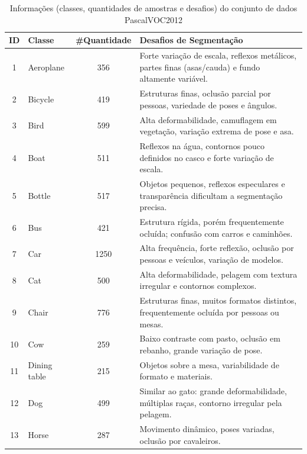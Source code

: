 \begin{table}[h!]
\centering
\caption{Informações (classes, quantidades de amostras e desafios) do conjunto de dados \ac{PascalVOC2012}}
\label{tab:pascal_classes}
\begin{tabular}{|c|l|c|p{9cm}|}
\hline
\textbf{ID} & \textbf{Classe} & \textbf{\#Quantidade} & \textbf{Desafios de Segmentação} \\
\hline

1  & Aeroplane     & 356 & Forte variação de escala, reflexos metálicos, partes finas (asas/cauda) e fundo altamente variável. \\ \hline
2  & Bicycle       & 419 & Estruturas finas, oclusão parcial por pessoas, variedade de poses e ângulos. \\ \hline
3  & Bird          & 599 & Alta deformabilidade, camuflagem em vegetação, variação extrema de pose e asa. \\ \hline
4  & Boat          & 511 & Reflexos na água, contornos pouco definidos no casco e forte variação de escala. \\ \hline
5  & Bottle        & 517 & Objetos pequenos, reflexos especulares e transparência dificultam a segmentação precisa. \\ \hline
6  & Bus           & 421 & Estrutura rígida, porém frequentemente ocluída; confusão com carros e caminhões. \\ \hline
7  & Car           & 1250 & Alta frequência, forte reflexão, oclusão por pessoas e veículos, variação de modelos. \\ \hline
8  & Cat           & 500 & Alta deformabilidade, pelagem com textura irregular e contornos complexos. \\ \hline
9  & Chair         & 776 & Estruturas finas, muitos formatos distintos, frequentemente ocluída por pessoas ou mesas. \\ \hline
10 & Cow           & 259 & Baixo contraste com pasto, oclusão em rebanho, grande variação de pose. \\ \hline
11 & Dining table   & 215 & Objetos sobre a mesa, variabilidade de formato e materiais. \\ \hline
12 & Dog           & 499 & Similar ao gato: grande deformabilidade, múltiplas raças, contorno irregular pela pelagem. \\ \hline
13 & Horse         & 287 & Movimento dinâmico, poses variadas, oclusão por cavaleiros. \\ \hline

\end{tabular}
\end{table}
